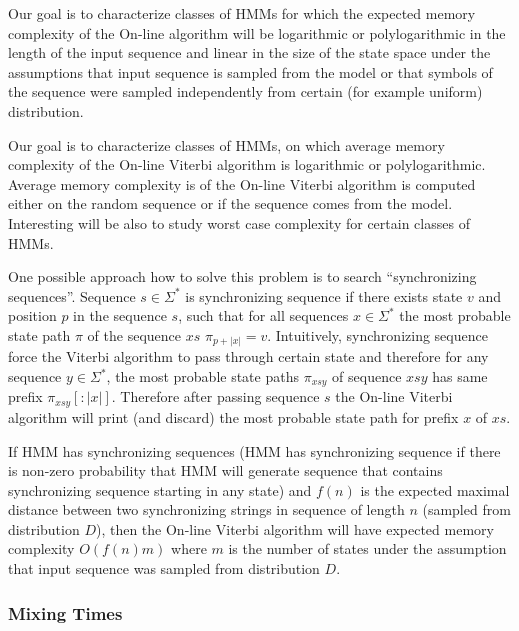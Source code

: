 Our goal is to characterize classes of HMMs for which  the expected memory
complexity of the On-line algorithm will be logarithmic or polylogarithmic in
the length of the input sequence and linear in the size of the state space
under the assumptions that input sequence is sampled from the model or that
symbols of the sequence were sampled independently from certain (for example
uniform) distribution.


Our goal is to characterize classes of HMMs, on which average memory complexity
of the On-line Viterbi algorithm is logarithmic or polylogarithmic. Average
memory complexity is of the On-line Viterbi algorithm is computed either on the
random sequence or if the sequence comes from the model. Interesting will be
also to study worst case complexity for certain classes of HMMs.

One possible approach how to solve this problem is to search ``synchronizing
sequences''. Sequence $s\in\Sigma^*$ is synchronizing sequence if there exists
state $v$ and position $p$ in the sequence $s$, such that for all sequences
$x\in \Sigma^*$ the most probable state path $\pi$ of the sequence $xs$
$\pi_{p+|x|}=v$. Intuitively, synchronizing sequence force the Viterbi algorithm
to pass through certain state and therefore for any sequence $y\in \Sigma^*$,
the most probable state paths $\pi_{xsy}$ of sequence $xsy$ has same prefix
$\pi_{xsy}[:|x|]$. Therefore after passing sequence $s$ the On-line Viterbi
algorithm will print (and discard) the most probable state path for prefix $x$
of $xs$. 

If HMM has synchronizing sequences (HMM has synchronizing sequence if there is
non-zero probability that HMM will generate sequence that contains synchronizing
sequence starting in any state) and $f(n)$ is the expected maximal distance
between two synchronizing strings in sequence of length $n$ (sampled from
distribution $D$), then the On-line Viterbi algorithm will have expected memory
complexity $O(f(n)m)$ where $m$ is the number of states under the assumption
that input sequence was sampled from distribution $D$.


\subsubsection{Mixing Times}

